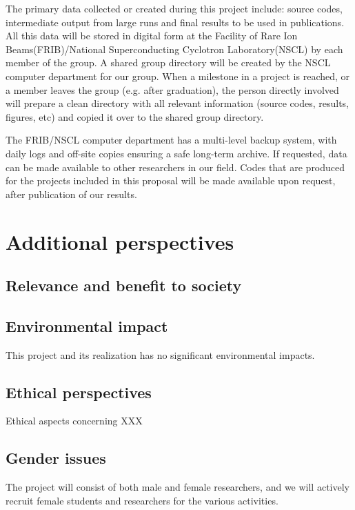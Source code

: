 \documentclass[10pt]{article}
\begin{document}
The primary data collected or created during this project include:
source codes, intermediate output from large runs and final results to
be used in publications. All this data will be stored in digital form
at the Facility of Rare Ion Beams(FRIB)/National Superconducting
Cyclotron Laboratory(NSCL) by each member of the group.  A shared
group directory will be created by the NSCL computer department for
our group. When a milestone in a project is reached, or a member
leaves the group (e.g. after graduation), the person directly involved
will prepare a clean directory with all relevant information (source
codes, results, figures, etc) and copied it over to the shared group
directory.
 
The FRIB/NSCL computer department has a multi-level backup system, with
daily logs and off-site copies ensuring a safe long-term archive.  If
requested, data can be made available to other researchers in our
field. Codes that are produced for the projects included in this
proposal will be made available upon request, after publication of our
results.

\section{Additional perspectives}

\subsection{Relevance and benefit to society}



\subsection{Environmental impact}

This project and its realization has no  significant environmental impacts.

\subsection{Ethical perspectives}

Ethical aspects concerning XXX

\subsection{Gender issues}


The project will consist of both male and female researchers, and we
will actively recruit female students and researchers for the various activities. 


\end{document}

